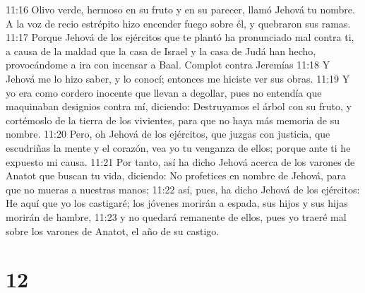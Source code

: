 11:16 Olivo verde, hermoso en su fruto y en su parecer, llamó Jehová tu nombre. A la voz de recio estrépito hizo encender fuego sobre él, y quebraron sus ramas.  
11:17 Porque Jehová de los ejércitos que te plantó ha pronunciado mal contra ti, a causa de la maldad que la casa de Israel y la casa de Judá han hecho, provocándome a ira con incensar a Baal.  
Complot contra Jeremías  
11:18 Y Jehová me lo hizo saber, y lo conocí; entonces me hiciste ver sus obras.  
11:19 Y yo era como cordero inocente que llevan a degollar, pues no entendía que maquinaban designios contra mí, diciendo: Destruyamos el árbol con su fruto, y cortémoslo de la tierra de los vivientes, para que no haya más memoria de su nombre.  
11:20 Pero, oh Jehová de los ejércitos, que juzgas con justicia, que escudriñas la mente y el corazón, vea yo tu venganza de ellos; porque ante ti he expuesto mi causa.  
11:21 Por tanto, así ha dicho Jehová acerca de los varones de Anatot que buscan tu vida, diciendo: No profetices en nombre de Jehová, para que no mueras a nuestras manos;  
11:22 así, pues, ha dicho Jehová de los ejércitos: He aquí que yo los castigaré; los jóvenes morirán a espada, sus hijos y sus hijas morirán de hambre,  
11:23 y no quedará remanente de ellos, pues yo traeré mal sobre los varones de Anatot, el año de su castigo.  

\chapter{12}


